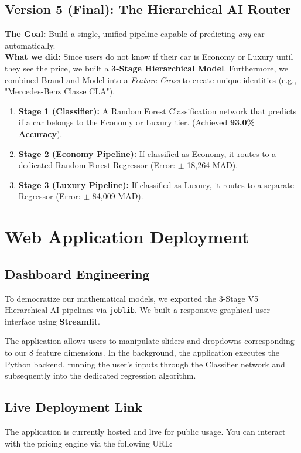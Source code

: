 \documentclass[12pt]{report}
\begin{document}
\section{Version 5 (Final): The Hierarchical AI Router}
\textbf{The Goal:} Build a single, unified pipeline capable of predicting \textit{any} car automatically. \\
\textbf{What we did:} Since users do not know if their car is Economy or Luxury until they see the price, we built a \textbf{3-Stage Hierarchical Model}. Furthermore, we combined Brand and Model into a \textit{Feature Cross} to create unique identities (e.g., "Mercedes-Benz Classe CLA").

\begin{enumerate}
    \item \textbf{Stage 1 (Classifier):} A Random Forest Classification network that predicts if a car belongs to the Economy or Luxury tier. (Achieved \textbf{93.0\% Accuracy}).
    \item \textbf{Stage 2 (Economy Pipeline):} If classified as Economy, it routes to a dedicated Random Forest Regressor (Error: $\pm$ 18,264 MAD).
    \item \textbf{Stage 3 (Luxury Pipeline):} If classified as Luxury, it routes to a separate Regressor (Error: $\pm$ 84,009 MAD).
\end{enumerate}

\newpage

\chapter{Web Application Deployment}

\section{Dashboard Engineering}
To democratize our mathematical models, we exported the 3-Stage V5 Hierarchical AI pipelines via \texttt{joblib}. We built a responsive graphical user interface using \textbf{Streamlit}.

The application allows users to manipulate sliders and dropdowns corresponding to our 8 feature dimensions. In the background, the application executes the Python backend, running the user's inputs through the Classifier network and subsequently into the dedicated regression algorithm.

\section{Live Deployment Link}
The application is currently hosted and live for public usage. You can interact with the pricing engine via the following URL:
\end{document}
